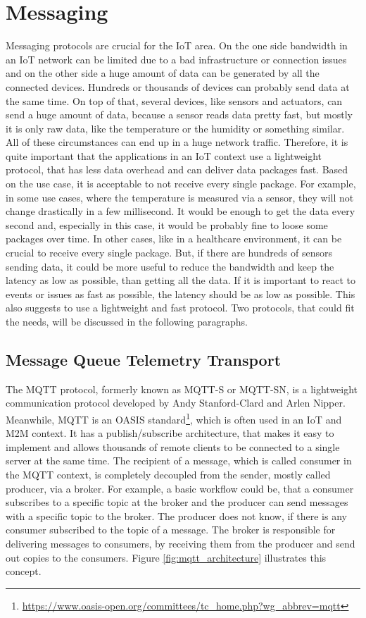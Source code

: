 \section{Messaging}
Messaging protocols are crucial for the \ac{IoT} area.
On the one side bandwidth in an \ac{IoT} network can be limited due to a bad infrastructure or connection issues and on the other side a huge amount of data can be generated by all the connected devices.
Hundreds or thousands of devices can probably send data at the same time.
On top of that, several devices, like sensors and actuators, can send a huge amount of data, because a sensor reads data pretty fast, but mostly it is only raw data, like the temperature or the humidity or something similar.
All of these circumstances can end up in a huge network traffic.
Therefore, it is quite important that the applications in an \ac{IoT} context use a lightweight protocol, that has less data overhead and can deliver data packages fast.
Based on the use case, it is acceptable to not receive every single package.
For example, in some use cases, where the temperature is measured via a sensor, they will not change drastically in a few millisecond.
It would be enough to get the data every second and, especially in this case, it would be probably fine to loose some packages over time.
In other cases, like in a healthcare environment, it can be crucial to receive every single package.
But, if there are hundreds of sensors sending data, it could be more useful to reduce the bandwidth and keep the latency as low as possible, than getting all the data.
If it is important to react to events or issues as fast as possible, the latency should be as low as possible.
This also suggests to use a lightweight and fast protocol.
Two protocols, that could fit the needs, will be discussed in the following paragraphs.

\subsection{Message Queue Telemetry Transport}
\label{section:MQTT}
The \ac{MQTT} protocol, formerly known as MQTT-S or MQTT-SN, is a lightweight communication protocol developed by Andy Stanford-Clard and Arlen Nipper.\autocite[cf.]{MQTT:FAQ}
Meanwhile, \ac{MQTT} is an \ac{OASIS} standard\footnote{\url{https://www.oasis-open.org/committees/tc_home.php?wg_abbrev=mqtt}}, which is often used in an \ac{IoT} and \ac{M2M} context.\autocite[cf.][p. 5]{lampkin:2012:mqtt}
It has a publish/subscribe architecture, that makes it easy to implement and allows thousands of remote clients to be connected to a single server at the same time.\autocite[cf.][p. 5]{lampkin:2012:mqtt}
The recipient of a message, which is called consumer in the \ac{MQTT} context, is completely decoupled from the sender, mostly called producer, via a broker.
For example, a basic workflow could be, that a consumer subscribes to a specific topic at the broker and the producer can send messages with a specific topic to the broker.
The producer does not know, if there is any consumer subscribed to the topic of a message.
The broker is responsible for delivering messages to consumers, by receiving them from the producer and send out copies to the consumers.
Figure \ref{fig:mqtt_architecture} illustrates this concept.

